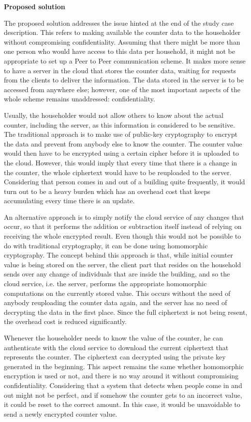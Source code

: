 \textbf{Proposed solution}

The proposed solution addresses the issue hinted at the end of the study case description. This refers to making available the counter data to the householder without compromising confidentiality. Assuming that there might be more than one person who would have access to this data per household, it might not be appropriate to set up a Peer to Peer communication scheme. It makes more sense to have a server in the cloud that stores the counter data, waiting for requests from the clients to deliver the information. The data stored in the server is to be accessed from anywhere else; however, one of the most important aspects of the whole scheme remains unaddressed: confidentiality.

Usually, the householder would not allow others to know about the actual counter, including the server, as this information is considered to be sensitive. The traditional approach is to make use of public-key cryptography to encrypt the data and prevent from anybody else to know the counter. The counter value would then have to be encrypted using a certain cipher before it is uploaded to the cloud. However, this would imply that every time that there is a change in the counter, the whole ciphertext would have to be reuploaded to the server. Considering that person comes in and out of a building quite frequently, it would turn out to be a heavy burden which has an overhead cost that keeps accumulating every time there is an update. 

An alternative approach is to simply notify the cloud service of any changes that occur, so that it performs the addition or subtraction itself instead of relying on receiving the whole encrypted result. Even though this would not be possible to do with traditional cryptography, it can be done using homomorphic cryptography. The concept behind this approach is that, while initial counter value is being stored on the server, the client part that resides on the household sends over any change of individuals that are inside the building, and so the cloud service, i.e. the server, performs the appropriate homomorphic computations on the currently stored value. This occurs without the need of anybody reuploading the counter data again, and the server has no need of decrypting the data in the first place. Since the full ciphertext is not being resent, the overhead cost is reduced significantly.

Whenever the householder needs to know the value of the counter, he can authenticate with the cloud service to download the current ciphertext that represents the counter. The ciphertext can decrypted using the private key generated in the beginning. This aspect remains the same whether homomorphic encryption is used or not, and there is no way around it without compromising confidentiality. Considering that a system that detects when people come in and out might not be perfect, and if somehow the counter gets to an incorrect value, it could be reset to the correct amount. In this case, it would be unavoidable to send a newly encrypted counter value.

